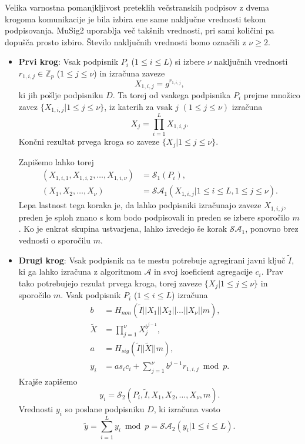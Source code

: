 \documentclass[isrm2, tisk]{fmfdelo}
\newcommand{\Z}{\mathbb Z}
\begin{document}
Velika varnostna pomanjkljivost preteklih večstranskih podpisov z dvema krogoma komunikacije je bila
izbira ene same naključne vrednosti tekom podpisovanja. MuSig2 uporablja več takšnih vrednosti, pri
sami količini pa dopušča prosto izbiro. Število naključnih vrednosti bomo označili z $\nu \geq 2$.
\begin{itemize}
    \item \textbf{Prvi krog}:
        Vsak podpisnik $P_i$ ($1 \le i \le L$) si izbere $\nu$ naključnih
        vrednosti $r_{1, i, j} \in \Z_p$ ($1 \le j \le \nu$) in izračuna zaveze
        $$
        X_{1, i, j} = g^{r_{1, i, j}},
        $$
        ki jih pošlje podpisniku $D$. Ta torej od vsakega podpisnika $P_i$ prejme množico zavez
        $\{X_{1, i, j} | 1 \le j \le \nu\}$, iz katerih za vsak $j$ $(1 \le j \le \nu)$ izračuna
        $$
        X_j = \prod_{i=1}^L X_{1, i, j}.
        $$
        Končni rezultat prvega kroga so zaveze $\{X_j | 1 \le j \le \nu\}$.

        Zapišemo lahko torej
        \begin{align*}
            (X_{1, i, 1}, X_{1, i, 2}, \dots, X_{1, i, \nu}) &= \mathcal{S}_1(P_i), \\
            (X_1, X_2, \dots, X_\nu) &= \mathcal{S}\mathcal{A}_1(X_{1, i, j} | 1 \le i \le L, 1 \le j \le \nu).
        \end{align*}
        Lepa lastnost tega koraka je, da lahko podpisniki izračunajo zaveze $X_{1, i, j}$, preden je
        sploh znano s kom bodo podpisovali in preden se izbere sporočilo $m$. Ko je enkrat skupina
        ustvarjena, lahko izvedejo še korak $\mathcal{S}\mathcal{A}_1$, ponovno brez vednosti o
        sporočilu $m$.

    \item \textbf{Drugi krog}:
        Vsak podpisnik na te mestu potrebuje agregirani javni ključ $\tilde{I}$, ki ga lahko izračuna
        z algoritmom $\mathcal{A}$ in svoj koeficient agregacije $c_i$. Prav tako potrebujejo rezulat
        prvega kroga, torej zaveze $\{X_j | 1 \le j \le \nu\}$ in sporočilo $m$. Vsak podpisnik $P_i$
        ($1 \le i \le L$) izračuna
        \begin{align*}
            b &= H_{non}(\tilde{I} || X_1 || X_2 || \dots || X_\nu || m), \\
            \tilde{X} &= \prod_{j=1}^\nu X_j^{b^{j-1}}, \\
            a &= H_{sig}(\tilde{I} || \tilde{X} || m), \\
            y_i &= a s_i c_i + \sum_{j=1}^\nu b^{j-1} r_{1, i, j} \bmod p.
        \end{align*}
        Krajše zapišemo
        $$
        y_i = \mathcal{S}_2(P_i, \tilde{I}, X_1, X_2, \dots, X_\nu, m).
        $$
        Vrednosti $y_i$ so poslane podpisniku $D$, ki izračuna vsoto
        $$
        \tilde{y} = \sum_{i=1}^L y_i \bmod p = \mathcal{S}\mathcal{A}_2(y_i | 1 \le i \le L).
        $$


\end{itemize}
\end{document}
